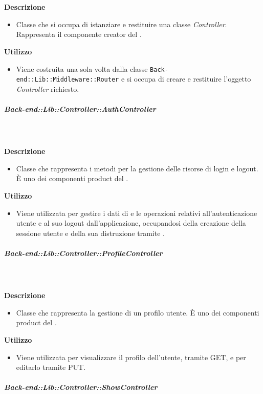         \textbf{\\ \\ Descrizione} 
          \begin{itemize}
            \item[] Classe che si occupa di istanziare e restituire una classe \textit{Controller}. Rappresenta il componente creator del  .
          \end{itemize}      
        \textbf{Utilizzo}  
          \begin{itemize}
            \item[] Viene costruita una sola volta dalla classe \texttt{Back-end::Lib::Middleware::Router} e si occupa di creare e restituire l'oggetto \textit{Controller} richiesto.
          \end{itemize}
      \subparagraph{Back-end::Lib::Controller::AuthController}
        
        \textbf{\\ \\ Descrizione} 
          \begin{itemize}
            \item[] Classe che rappresenta i metodi per la gestione delle risorse di login e logout. È uno dei componenti product del  .

          \end{itemize}      
        \textbf{Utilizzo}  
          \begin{itemize}
            \item[] Viene utilizzata per gestire i dati di e le operazioni relativi all'autenticazione utente e al suo logout dall'applicazione, occupandosi della creazione della sessione utente e della sua distruzione tramite .
          \end{itemize}
      \subparagraph{Back-end::Lib::Controller::ProfileController}
        
        \textbf{\\ \\ Descrizione} 
          \begin{itemize}
            \item[] Classe che rappresenta la gestione di un profilo utente. È uno dei componenti product del  .
          \end{itemize}      
        \textbf{Utilizzo}  
          \begin{itemize}
            \item[] Viene utilizzata per visualizzare il profilo dell'utente, tramite GET, e per editarlo tramite PUT.
          \end{itemize}
      \subparagraph{Back-end::Lib::Controller::ShowController}
        
